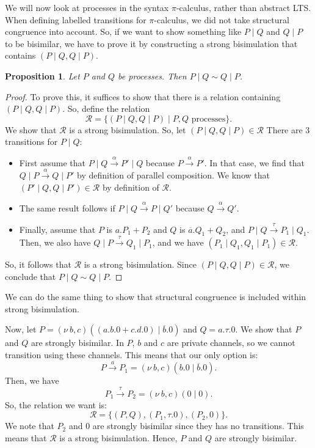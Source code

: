 \documentclass[a4paper, openany]{memoir}
\newtheorem{proposition}{Proposition}[section]
\theoremstyle{definition}
\begin{document}
    We will now look at processes in the syntax $\pi$-calculus, rather than abstract LTS. When defining labelled transitions for $\pi$-calculus, we did not take structural congruence into account. So, if we want to show something like $P \mid Q$ and $Q \mid P$ to be bisimilar, we have to prove it by constructing a strong bisimulation that contains $(P \mid Q, Q \mid P)$. 
    
    \begin{proposition}
        Let $P$ and $Q$ be processes. Then $P \mid Q \sim Q \mid P$.
    \end{proposition}
    \begin{proof}
        To prove this, it suffices to show that there is a relation containing $(P \mid Q, Q \mid P)$. So, define the relation
        \[\mathcal{R} = \{(P \mid Q, Q \mid P) \mid P, Q \textrm{ processes}\}.\]
        We show that $\mathcal{R}$ is a strong bisimulation. So, let $(P \mid Q, Q \mid P) \in \mathcal{R}$ There are 3 transitions for $P \mid Q$:
        \begin{itemize}
            \item First assume that $P \mid Q \xrightarrow{\alpha} P' \mid Q$ because $P \xrightarrow{\alpha} P'$. In that case, we find that $Q \mid P \xrightarrow{\alpha} Q \mid P'$ by definition of parallel composition. We know that $(P' \mid Q, Q \mid P') \in \mathcal{R}$ by definition of $\mathcal{R}$.
            
            \item The same result follows if $P \mid Q \xrightarrow{\alpha} P \mid Q'$ because $Q \xrightarrow{\alpha} Q'$.
            
            \item Finally, assume that $P$ is $a.P_1 + P_2$ and $Q$ is $\overline{a}.Q_1 + Q_2$, and $P \mid Q \xrightarrow{\tau} P_1 \mid Q_1$. Then, we also have $Q \mid P \xrightarrow{\tau} Q_1 \mid P_1$, and we have $(P_1 \mid Q_1, Q_1 \mid P_1) \in \mathcal{R}$.
        \end{itemize}
        So, it follows that $\mathcal{R}$ is a strong bisimulation. Since $(P \mid Q, Q \mid P) \in \mathcal{R}$, we conclude that $P \mid Q \sim Q \mid P$.
    \end{proof}
    \noindent We can do the same thing to show that structural congruence is included within strong bisimulation.

    Now, let $P = (\nu \ b, c)((a.b.0 + c.d.0) \mid \overline{b}.0)$ and $Q = a.\tau.0$. We show that $P$ and $Q$ are strongly bisimilar. In $P$, $b$ and $c$ are private channels, so we cannot transition using these channels. This means that our only option is:
    \[P \xrightarrow{a} P_1 = (\nu \ b, c)(b.0 \mid \overline{b}.0).\]
    Then, we have
    \[P_1 \xrightarrow{\tau} P_2 = (\nu \ b, c)(0 \mid 0).\]
    So, the relation we want is:
    \[\mathcal{R} = \{(P, Q), (P_1, \tau.0), (P_2, 0)\}.\]
    We note that $P_2$ and $0$ are strongly bisimilar since they has no transitions. This means that $\mathcal{R}$ is a strong bisimulation. Hence, $P$ and $Q$ are strongly bisimilar.
\end{document}

